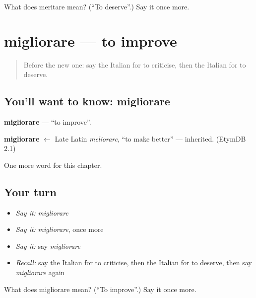 \begin{tcolorbox}[breakable,colback=teal!4,colframe=teal!35!black,title={Before you move on}]
What does meritare mean? (\textquotedblleft{}To deserve\textquotedblright{}.) Say it once more.
\end{tcolorbox}
\section[migliorare]{migliorare — to improve}

\label{lesson:IT-C146-migliorare}



\begin{quote}
Before the new one: say the Italian for to criticise, then the Italian for to deserve.
\end{quote}

\subsection*{You'll want to know: migliorare}
\textbf{migliorare} — \textquotedblleft{}to improve\textquotedblright{}.

\begin{cousinweb}
\textbf{migliorare} $\leftarrow$ Late Latin \emph{meliorare}, \textquotedblleft{}to make better\textquotedblright{} — inherited. (EtymDB 2.1)
\end{cousinweb}

\begin{grammarlens}[title={What you've built}]
One more word for this chapter.
\end{grammarlens}

\subsection*{Your turn}
\begin{itemize}
\raggedright
  \item \emph{Say it:} \emph{migliorare}
  \item \emph{Say it:} \emph{migliorare}, once more
  \item \emph{Say it:} say \emph{migliorare}
  \item \emph{Recall:} say the Italian for to criticise, then the Italian for to deserve, then say \emph{migliorare} again
\end{itemize}

\begin{tcolorbox}[breakable,colback=teal!4,colframe=teal!35!black,title={Before you move on}]
What does migliorare mean? (\textquotedblleft{}To improve\textquotedblright{}.) Say it once more.
\end{tcolorbox}
